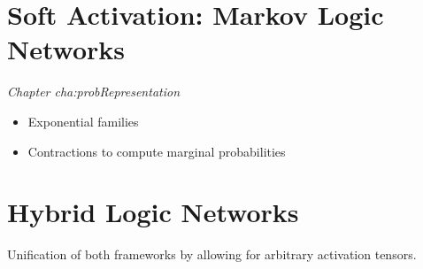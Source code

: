 \documentclass[aps,onecolumn,nofootinbib,pra]{article}
\renewcommand{\charef}[1]{\textit{Chapter #1}}
\begin{document}
    \section{Soft Activation: Markov Logic Networks}

    \charef{cha:probRepresentation}
    \begin{itemize}
        \item Exponential families
        \item Contractions to compute marginal probabilities
    \end{itemize}


    \section{Hybrid Logic Networks}

    Unification of both frameworks by allowing for arbitrary activation tensors.
\end{document}
